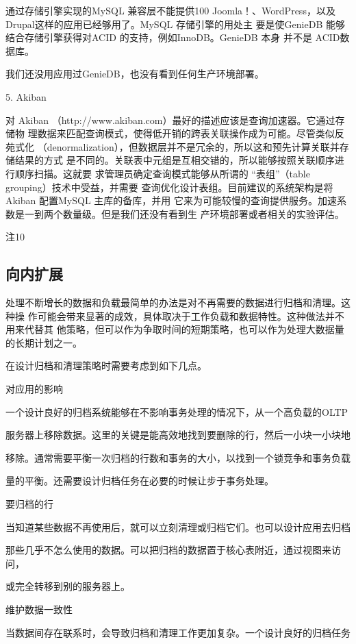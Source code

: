 通过存储引擎实现的MySQL 兼容层不能提供100%
Joomla！、WordPress，以及 Drupal这样的应用已经够用了。MySQL 存储引擎的用处主
要是使GenieDB 能够结合存储引擎获得对ACID 的支持，例如InnoDB。GenieDB 本身
并不是 ACID数据库。

我们还没用应用过GenieDB，也没有看到任何生产环境部署。

5. Akiban

对 Akiban （http://www.akiban.com）最好的描述应该是查询加速器。它通过存储物
理数据来匹配查询模式，使得低开销的跨表关联操作成为可能。尽管类似反苑式化
（denormalization），但数据层并不是冗余的，所以这和预先计算关联并存储结果的方式
是不同的。关联表中元组是互相交错的，所以能够按照关联顺序进行顺序扫描。这就要
求管理员确定查询模式能够从所谓的 “表组”（table grouping）技术中受益，并需要
查询优化设计表组。目前建议的系统架构是将 Akiban 配置MySQL 主库的备库，并用
它来为可能较慢的查询提供服务。加速系数是一到两个数量级。但是我们还没有看到生
产环境部署或者相关的实验评估。

注10

\subsection{向内扩展}
处理不断增长的数据和负载最简单的办法是对不再需要的数据进行归档和清理。这种操
作可能会带来显著的成效，具体取决于工作负载和数据特性。这种做法并不用来代替其
他策略，但可以作为争取时间的短期策略，也可以作为处理大数据量的长期计划之一。

在设计归档和清理策略时需要考虑到如下几点。

对应用的影响

一个设计良好的归档系统能够在不影响事务处理的情况下，从一个高负载的OLTP

服务器上移除数据。这里的关键是能高效地找到要删除的行，然后一小块一小块地

移除。通常需要平衡一次归档的行数和事务的大小，以找到一个锁竞争和事务负载

量的平衡。还需要设计归档任务在必要的时候让步于事务处理。

要归档的行

当知道某些数据不再使用后，就可以立刻清理或归档它们。也可以设计应用去归档

那些几乎不怎么使用的数据。可以把归档的数据置于核心表附近，通过视图来访问，

或完全转移到别的服务器上。

维护数据一致性

当数据间存在联系时，会导致归档和清理工作更加复杂。一个设计良好的归档任务

